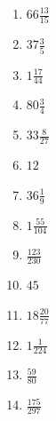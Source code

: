 \documentclass[12pt]{article}
\begin{document}
\begin{enumerate}
\item $ 66 \frac{13}{15} $
\item $ 37 \frac{3}{5} $
\item $ 1 \frac{17}{44} $
\item $ 80 \frac{3}{4} $
\item $ 33 \frac{8}{27} $
\item $ 12 $
\item $ 36 \frac{1}{9} $
\item $ 1 \frac{55}{104} $
\item $ \frac{123}{230} $
\item $ 45 $
\item $ 18 \frac{20}{77} $
\item $ 1 \frac{1}{224} $
\item $ \frac{59}{80} $
\item $ \frac{175}{297} $
\end{enumerate}
\newpage
\end{document}
